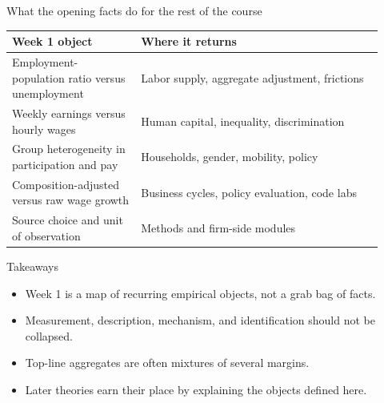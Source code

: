 \documentclass[aspectratio=169,11pt]{beamer}
\begin{document}
\begin{frame}{What the opening facts do for the rest of the course}
\small
\begin{tabular}{p{0.32\linewidth} p{0.60\linewidth}}
\toprule
Week 1 object & Where it returns \\
\midrule
Employment-population ratio versus unemployment & Labor supply, aggregate adjustment, frictions \\
Weekly earnings versus hourly wages & Human capital, inequality, discrimination \\
Group heterogeneity in participation and pay & Households, gender, mobility, policy \\
Composition-adjusted versus raw wage growth & Business cycles, policy evaluation, code labs \\
Source choice and unit of observation & Methods and firm-side modules \\
\bottomrule
\end{tabular}
\end{frame}

\begin{frame}{Takeaways}
\begin{itemize}
    \item Week 1 is a map of recurring empirical objects, not a grab bag of facts.
    \item Measurement, description, mechanism, and identification should not be collapsed.
    \item Top-line aggregates are often mixtures of several margins.
    \item Later theories earn their place by explaining the objects defined here.
\end{itemize}
\end{frame}
\end{document}
